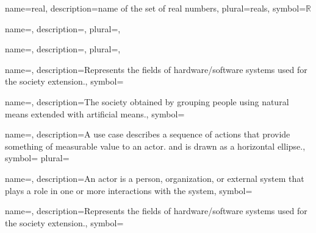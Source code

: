 
{name={real},
description={name of the set of real numbers},
plural={reals},
symbol={\ensuremath{\mathbb{R}}}
}

{name={},
description={},
plural={},
}

{name={},
description={},
plural={},
}

{name={},
description={Represents the fields of hardware/software
systems used for the society extension.},
symbol={}
}

{name={},
description={The society obtained by grouping people using natural means
extended with artificial means.},
symbol={} }

{name={},
description={A use case describes a sequence of actions that provide something
of measurable value to an actor. and is drawn as a horizontal ellipse.},
symbol={} plural={} }

{name={},
description={An actor is a person, organization, or external system that plays a role in one or more interactions with the system},
symbol={} }

{name={},
description={Represents the fields of hardware/software
systems used for the society extension.},
symbol={}
}


